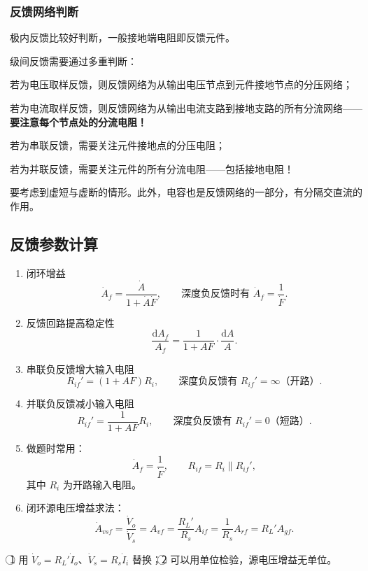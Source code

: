 \documentclass[UTF8,fontset=fandol,zihao=5]{ctexart}
\newcommand{\parallelsum}{\mathbin{\|}}
\newcommand{\dd}{\mathrm{d}}
\begin{document}
{\subsubsection{反馈网络判断}

极内反馈比较好判断，一般接地端电阻即反馈元件。

级间反馈需要通过多重判断：

若为电压取样反馈，则反馈网络为从输出电压节点到元件接地节点的分压网络；

若为电流取样反馈，则反馈网络为从输出电流支路到接地支路的所有分流网络——\textbf{要注意每个节点处的分流电阻！}

若为串联反馈，需要关注元件接地点的分压电阻；

若为并联反馈，需要关注元件的所有分流电阻——包括接地电阻！

要考虑到虚短与虚断的情形。此外，电容也是反馈网络的一部分，有分隔交直流的作用。

\subsection{反馈参数计算}

\begin{enumerate}
  \item 闭环增益
  \[
    \dot A_f=\frac{\dot A}{1+\dot A\dot F},
    \qquad
    \text{深度负反馈时有 }\dot A_f=\frac1{\dot F}.
  \]

  \item 反馈回路提高稳定性
  \[
    \frac{\dd A_f}{A_f}=\frac1{1+AF}\cdot\frac{\dd A}{A}.
  \]

  \item 串联负反馈增大输入电阻
  \[
    R_{if}'=(1+AF)R_i,
    \qquad
    \text{深度负反馈有 }R_{if}'=\infty\text{（开路）}.
  \]

  \item 并联负反馈减小输入电阻
  \[
    R_{if}'=\frac1{1+AF}R_i,
    \qquad
    \text{深度负反馈有 }R_{if}'=0\text{（短路）}.
  \]

  \item 做题时常用：
  \[
    \dot A_f=\frac1{\dot F},
    \qquad
    R_{if}=R_i\parallelsum R_{if}',
  \]
  其中 $R_i$ 为开路输入电阻。

  \item 闭环源电压增益求法：
  \[
    \dot A_{vsf}=\frac{\dot V_o}{\dot V_s}
    =A_{vf}=\frac{R_L'}{R_s}A_{if}
    =\frac1{R_s}A_{rf}=R_L'A_{gf}.
  \]
\end{enumerate}

\begin{methodbox}[【技巧】闭环源电压增益]
\textcircled{\scriptsize 1} 用 $\dot V_o=R_L'\dot I_o$、$\dot V_s=R_s\dot I_i$ 替换；\textcircled{\scriptsize 2} 可以用单位检验，源电压增益无单位。


\end{methodbox}}
\end{document}
